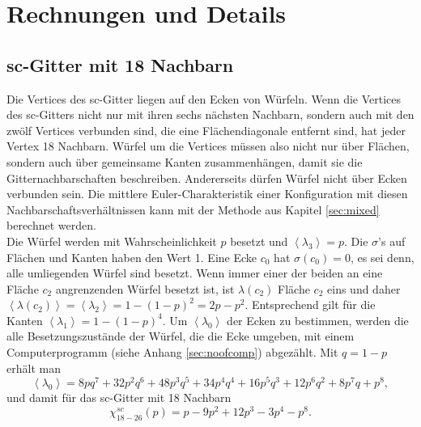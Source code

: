 
\chapter{Rechnungen und Details}
\label{sec:fluct_topo}

\section{sc-Gitter mit 18 Nachbarn}
\label{sec:appsc}
Die Vertices des sc-Gitter liegen auf den Ecken von W\"urfeln. Wenn die Vertices des sc-Gitters nicht nur mit ihren sechs n\"achsten Nachbarn, sondern auch mit den zw\"olf Vertices verbunden sind, die eine Fl\"achendiagonale entfernt sind, hat jeder Vertex 18 Nachbarn. W\"urfel um die Vertices m\"ussen also nicht nur \"uber Fl\"achen, sondern auch \"uber gemeinsame Kanten zusammenh\"angen, damit sie die Gitternachbarschaften beschreiben. Andererseits d\"urfen W\"urfel nicht \"uber Ecken verbunden sein. Die mittlere Euler-Charakteristik einer Konfiguration mit diesen Nachbarschaftsverh\"altnissen kann mit der Methode aus Kapitel \ref{sec:mixed} berechnet werden.
\\Die W\"urfel werden mit Wahrscheinlichkeit $p$ besetzt und $\left<\lambda_3\right>=p$. Die $\sigma$'s auf Fl\"achen und Kanten haben den Wert 1. Eine Ecke $c_0$ hat $\sigma(c_0)=0$, es sei denn, alle umliegenden W\"urfel sind besetzt. Wenn immer einer der beiden an eine Fl\"ache $c_2$ angrenzenden W\"urfel besetzt ist, ist $\lambda(c_2)$ Fl\"ache $c_2$ eins und daher $\left<\lambda(c_2)\right>=\left<\lambda_2\right>= 1-(1-p)^2=2p-p^2$. Entsprechend gilt f\"ur die Kanten $\left<\lambda_1\right>  = 1-(1-p)^4 $. Um $\left<\lambda_0\right>$ der Ecken zu bestimmen, werden die alle Besetzungszust\"ande der W\"urfel, die die Ecke umgeben, mit einem Computerprogramm (siehe Anhang \ref{sec:noofcomp}) abgez\"ahlt. Mit $q=1-p$ erh\"alt man
\begin{equation}
  \left< \lambda_0\right> = 8pq^7+32p^2q^6+48p^3q^5+34p^4q^4+16p^5q^3+12p^6q^2+8p^7q+p^8,
\end{equation}
und damit f\"ur das sc-Gitter mit 18 Nachbarn
 \begin{equation}
  \chi_{18-26}^{sc}(p)=p-9p^2+12p^3-3p^4-p^8.
\end{equation}

